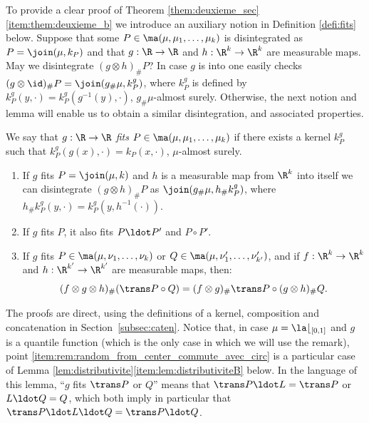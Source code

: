 To provide a clear proof of Theorem \ref{them:deuxieme_sec}\eqref{item:them:deuxieme_b} we introduce an auxiliary notion in Definition \ref{defi:fits} below.
Suppose that some $P\in \ma(\mu,\mu_1,\ldots,\mu_k)$ is disintegrated as $P=\join(\mu,k_{P})$ and that $g:\R\to \R$ and $h:\R^k\to \R^k$ are measurable maps. May we disintegrate $(g\otimes h)_\#P$? In case $g$ is into one easily checks $(g\otimes \id)_\#P=\join(g_\#\mu,k^g_P)$, where $k^g_P$ is defined by $k^g_P(y,\cdot)= k^g_P(g^{-1}(y),\cdot)$, $g_\#\mu$-almost surely. Otherwise, the next notion and lemma will enable us to obtain a similar disintegration, and associated properties.

\begin{defi}\label{defi:fits}
We say that $g:\R\to \R$ \emph{fits} $P\in \ma(\mu,\mu_1,\ldots,\mu_k)$ if there exists a kernel $k^g_P$ such that $k^g_P(g(x),\cdot)=k_{P}(x,\cdot)$, $\mu$-almost surely.
\end{defi}

\skpt
\begin{rem}\label{rem:random_from_center}\begin{enumerate}
\item
\label{item:rem:random_from_center_a} If $g$ fits $P=\join(\mu,k)$ and $h$ is a measurable map from $\R^k$ into itself we can disintegrate $(g\otimes h)_\#P$ as $\join(g_\#\mu,h_\#k^g_P)$, where $h_\#k^g_P(y,\cdot)= k^g_P(y,h^{-1}(\cdot))$.

\item
\label{item:rallonge} If $g$ fits $P$, it also fits $P\ldot P'$ and $P\circ P'$.

\item
\label{item:rem:random_from_center_commute_avec_circ} If $g$ fits $P\in \ma(\mu,\nu_1,\ldots,\nu_k)$ or $Q\in\ma(\mu,\nu'_1,\ldots,\nu'_{k'})$, and if $f:\R^k\to\R^k$ and $h:\R^{k'}\to\R^{k'}$ are measurable maps, then:
\[(f\otimes g \otimes h)_\#(\trans P\circ Q)=(f\otimes g)_\#\trans P\circ (g \otimes h)_\#Q.\]
\end{enumerate}

The proofs are direct, using the definitions of a kernel, composition and concatenation in Section~\ref{subsec:caten}. Notice that, in case $\mu=\la\lfloor_{[0,1]}$ and $g$ is a quantile function (which is the only case in which we will use the remark), point \eqref{item:rem:random_from_center_commute_avec_circ} is a particular case of Lemma \ref{lem:distributivite}\eqref{item:lem:distributiviteB} below. In the language of this lemma, ``$g$ fits $\trans P$ or $Q$'' means that $\trans P\ldot L=\trans P$ or $L\ldot Q=Q$, which both imply in particular that $\trans P\ldot L\ldot Q=\trans P\ldot Q$.
\end{rem}

